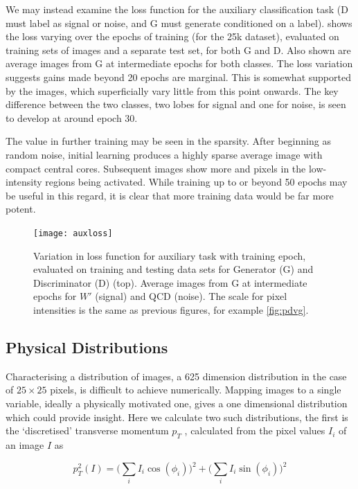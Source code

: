 \documentclass[twocolumn]{article}
\begin{document}
We may instead examine the loss function for the auxiliary classification task (D must label as signal or noise, and G must generate conditioned on a label).  shows the loss varying over the epochs of training (for the 25k dataset), evaluated on training sets of images and a separate test set, for both G and D. Also shown are average images from G at intermediate epochs for both classes. The loss variation suggests gains made beyond 20 epochs are marginal. This is somewhat supported by the images, which superficially vary little from this point onwards. The key difference between the two classes, two lobes for signal and one for noise, is seen to develop at around epoch 30. 

The value in further training may be seen in the sparsity. After beginning as random noise, initial learning produces a highly sparse average image with compact central cores. Subsequent images show more and pixels in the low-intensity regions being activated. While training up to or beyond 50 epochs may be useful in this regard, it is clear that more training data would be far more potent.

	\begin{figure}[!htbp]
		\centering
		\texttt{[image: auxloss]}
		
		\caption{Variation in loss function for auxiliary task with training epoch, evaluated on training and testing data sets for Generator (G) and Discriminator (D) (top). Average images from G at intermediate epochs for $W'$ (signal) and QCD (noise). The scale for pixel intensities is the same as previous figures, for example \cref{fig:pdvg}.} 
		\label{fig:auxloss}
		
	\end{figure} 

\subsection{Physical Distributions}
\label{sec:physical}
Characterising a distribution of images, a 625 dimension distribution in the case of $25\times25$ pixels, is difficult to achieve numerically. Mapping images to a single variable, ideally a physically motivated one, gives a one dimensional distribution which could provide insight. Here we calculate two such distributions, the first is the `discretised' transverse momentum $p_T$ \cite{de2017learning}, calculated from the pixel values $I_i$ of an image $I$ as 

$$
p_T^2(I) = \bigg(\sum_i I_i \cos(\phi_i)\bigg)^2 + \bigg(\sum_i I_i \sin(\phi_i)\bigg)^2
$$
\end{document}
